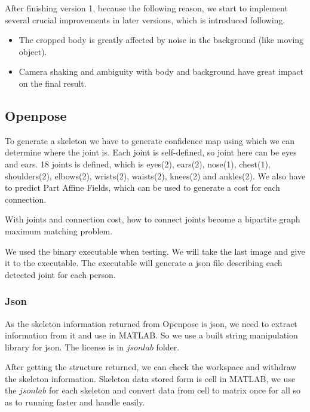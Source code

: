 \documentclass[11pt,twocolumn,letterpaper]{article}
\begin{document}
		\par
		After finishing version 1, because the following reason, we start to implement several crucial improvements in later versions, which is introduced following.
		\begin{itemize}
		\item The cropped body is greatly affected by noise in the background (like moving object).
		\item Camera shaking and ambiguity with body and background have great impact on the final result.
		\end{itemize}
	\subsection{Openpose\cite{cao2017realtime}}
	    \par To generate a skeleton we have to generate confidence map using which we can determine where the joint is.
		Each joint is self-defined, so joint here can be eyes and ears.
		18 joints is defined, which is eyes(2), ears(2), nose(1), chest(1), shoulders(2), elbows(2), wrists(2), waists(2), knees(2) and ankles(2).
		We also have to predict Part Affine Fields, which can be used to generate a cost for each connection.
		\par With joints and connection cost, how to connect joints become a bipartite graph maximum matching problem.
		\par We used the binary executable\cite{cao2017realtime} when testing. We will take the last image and give it to the executable. The executable will generate a json file describing each detected joint for each person.
	    \subsubsection{Json}
        \par As the skeleton information returned from Openpose is json, we need to extract information from it and use in MATLAB. So we use a built string manipulation library for json. The license is in $jsonlab$ folder.
        \par After getting the structure returned, we can check the workspace and withdraw the skeleton information. Skeleton data stored form is cell in MATLAB, we use the $jsonlab$ for each skeleton and convert data from cell to matrix once for all so as to running faster and handle easily.
\end{document}
